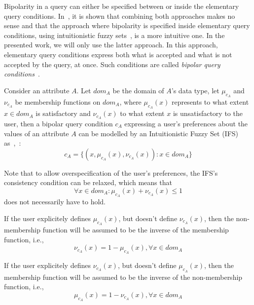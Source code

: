 \documentclass[runningheads,a4paper]{llncs}
\begin{document}
Bipolarity in a query can either be specified between or inside the elementary query conditions. In~\cite{Matthe2011ijis}, it is shown that combining both approaches makes no sense and that the approach where bipolarity is specified inside elementary query conditions, using intuitionistic fuzzy sets~\cite{Atanassov1986fss}, is a more intuitive one. In the presented work, we will only use the latter approach. In this approach, elementary query conditions express both what is accepted and what is not accepted by the query, at once. Such conditions are called \emph{bipolar query conditions}~\cite{Matthe2011ijis}.

Consider an attribute $A$. Let $dom_{A}$ be the domain of $A$'s data type, let $\mu_{c_{A}}$ and $\nu_{c_{A}}$ be membership functions on $dom_{A}$, where $\mu_{c_{A}}(x)$ represents to what extent $x \in dom_{A}$ is satisfactory and $\nu_{c_{A}}(x)$ to what extent $x$ is unsatisfactory to the user, then a bipolar query condition $c_{A}$ expressing a user's preferences about the values of an attribute $A$ can be modelled by an Intuitionistic Fuzzy Set (IFS)~\cite{Atanassov1986fss} as~\cite{Matthe2011ijis},~\cite{DeTre2010ieeetfs}:
\begin{equation}
c_{A} = \{(x, \mu_{c_{A}}(x), \nu_{c_{A}}(x)) : x \in dom_{A}\} \nonumber
\end{equation}

Note that to allow overspecification of the user's preferences, the IFS's consistency condition can be relaxed, which means that 
\begin{equation}
\forall x \in dom_{A}: \mu_{c_{A}}(x) + \nu_{c_{A}}(x) \leq 1 \nonumber
\end{equation}
does not necessarily have to hold.

If the user explicitely defines $\mu_{c_{A}}(x)$, but doesn't define $\nu_{c_{A}}(x)$, then the non-membership function will be assumed to be the inverse of the membership function, i.e., 
\begin{equation}
\nu_{c_{A}}(x) = 1 - \mu_{c_{A}}(x), \forall x \in dom_{A} \nonumber
\end{equation}

If the user explicitely defines $\nu_{c_{A}}(x)$, but doesn't define $\mu_{c_{A}}(x)$, then the membership function will be assumed to be the inverse of the non-membership function, i.e.,
\begin{equation}
\mu_{c_{A}}(x) = 1 - \nu_{c_{A}}(x), \forall x \in dom_{A} \nonumber
\end{equation}
\end{document}
